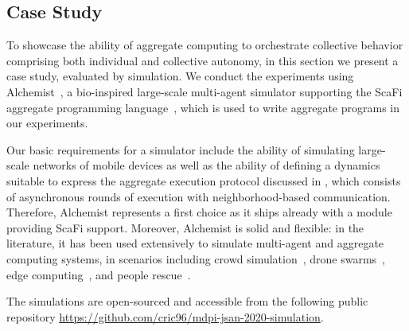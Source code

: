 \documentclass[jsan,article,accept,moreauthors,pdftex]{Definitions/mdpi}
\begin{document}
\begin{paracol}{2}
\section{Case Study}
\label{s:eval}

To showcase the ability of aggregate computing to orchestrate collective behavior
 comprising both individual and collective autonomy, in this section we present a case study, evaluated by simulation. 
% 
We conduct the experiments using Alchemist~\cite{DBLP:journals/jos/PianiniMV13}, a bio-inspired large-scale multi-agent simulator
 supporting the ScaFi aggregate programming language~\cite{Casadei2016mass}, which is used to write aggregate programs in our experiments. 

Our basic requirements for a simulator
 include the ability of
 simulating large-scale networks of mobile devices
 as well as the ability of 
 defining a dynamics suitable to express
 the aggregate execution protocol discussed in , which consists of asynchronous rounds of execution with neighborhood-based communication.
%
Therefore, Alchemist represents a first choice 
 as it ships already with a module providing 
 ScaFi support.
%
Moreover, Alchemist is solid and flexible:
 in the literature, it has been used extensively 
 to simulate multi-agent and aggregate computing systems,
 in scenarios including 
 crowd simulation~\cite{DBLP:journals/computer/BealPV15}, 
 drone swarms~\cite{DBLP:journals/eaai/CasadeiVAPD21},
 edge computing~\cite{casadei2019fmec}, 
 and people rescue~\cite{viroli2017ijaose-aggregate-plans}.

%
%
The simulations are open-sourced and accessible from the following public repository \url{https://github.com/cric96/mdpi-jsan-2020-simulation}.


%


\end{paracol}
\end{document}

